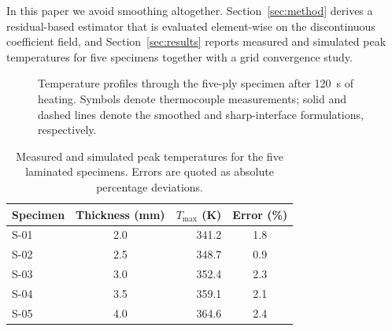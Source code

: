 \documentclass[11pt,a4paper]{article}
\begin{document}
In this paper we avoid smoothing altogether. Section~\ref{sec:method} derives a
residual-based estimator that is evaluated element-wise on the discontinuous
coefficient field, and Section~\ref{sec:results} reports measured and simulated
peak temperatures for five specimens together with a grid convergence study.

\begin{figure}[htbp]
\centering
\caption{Temperature profiles through the five-ply specimen after 120~s of
heating. Symbols denote thermocouple measurements; solid and dashed lines denote
the smoothed and sharp-interface formulations, respectively.}
\label{fig:profile}
\end{figure}

\begin{table}[htbp]
\centering
\caption{Measured and simulated peak temperatures for the five laminated
specimens. Errors are quoted as absolute percentage deviations.}
\label{tab:peaks}
\begin{tabular}{|l|c|r|c|}
\hline
\textbf{Specimen} & \textbf{Thickness (mm)} & \textbf{$T_{\max}$ (K)} & \textbf{Error (\%)} \\
\hline
S-01 & 2.0 & 341.2 & 1.8 \\
S-02 & 2.5 & 348.7 & 0.9 \\
S-03 & 3.0 & 352.4 & 2.3 \\
S-04 & 3.5 & 359.1 & 2.1 \\
S-05 & 4.0 & 364.6 & 2.4 \\
\hline
\end{tabular}
\end{table}
\end{document}
